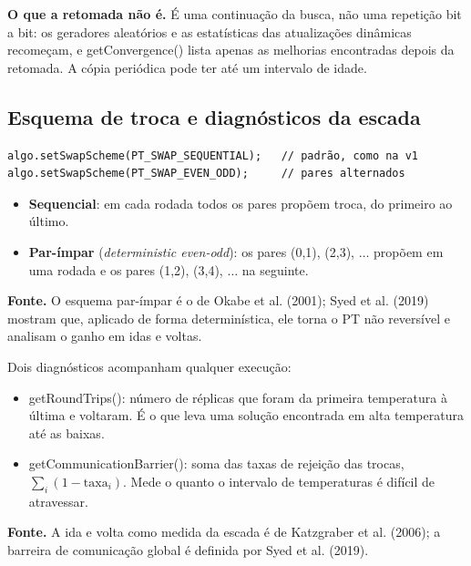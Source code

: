 \documentclass[10pt,a4paper]{article}
\newcommand{\code}[1]{{\ttfamily #1}}
\begin{document}
\begin{nota}
\textbf{O que a retomada não é.} É uma continuação da busca, não uma repetição bit a bit: os geradores aleatórios e as estatísticas das atualizações dinâmicas recomeçam, e \code{getConvergence()} lista apenas as melhorias encontradas depois da retomada. A cópia periódica pode ter até um intervalo de idade.
\end{nota}

\subsection{Esquema de troca e diagnósticos da escada}

\begin{lstlisting}[style=cpp]
algo.setSwapScheme(PT_SWAP_SEQUENTIAL);   // padrão, como na v1
algo.setSwapScheme(PT_SWAP_EVEN_ODD);     // pares alternados
\end{lstlisting}

\begin{itemize}
\item \textbf{Sequencial}: em cada rodada todos os pares propõem troca, do primeiro ao último.
\item \textbf{Par-ímpar} (\textit{deterministic even-odd}): os pares (0,1), (2,3), $\dots$ propõem em uma rodada e os pares (1,2), (3,4), $\dots$ na seguinte. \end{itemize}

\begin{fonte}
\textbf{Fonte.} O esquema par-ímpar é o de Okabe et al. (2001); Syed et al. (2019) mostram que, aplicado de forma determinística, ele torna o PT não reversível e analisam o ganho em idas e voltas.
\end{fonte}

Dois diagnósticos acompanham qualquer execução:

\begin{itemize}
\item \code{getRoundTrips()}: número de réplicas que foram da primeira temperatura à última e voltaram. É o que leva uma solução encontrada em alta temperatura até as baixas.
\item \code{getCommunicationBarrier()}: soma das taxas de rejeição das trocas, $\sum_i (1 - \mathrm{taxa}_i)$. Mede o quanto o intervalo de temperaturas é difícil de atravessar. \end{itemize}

\begin{fonte}
\textbf{Fonte.} A ida e volta como medida da escada é de Katzgraber et al. (2006); a barreira de comunicação global é definida por Syed et al. (2019).
\end{fonte}
\end{document}
